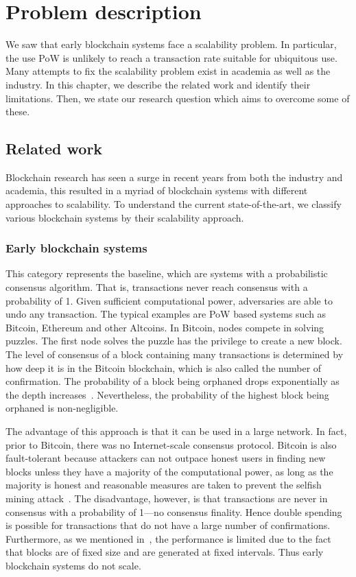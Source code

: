 \chapter{Problem description}
\label{ch:problem}

We saw that early blockchain systems face a scalability problem.
In particular, the use PoW is unlikely to reach a transaction rate suitable for ubiquitous use.
Many attempts to fix the scalability problem exist in academia as well as the industry.
In this chapter, we describe the related work and identify their limitations.
Then, we state our research question which aims to overcome some of these.

\section{Related work}
\label{sec:taxonomy}

Blockchain research has seen a surge in recent years from both the industry and academia,
this resulted in a myriad of blockchain systems with different approaches to scalability.
To understand the current state-of-the-art,
we classify various block\-chain systems by their scalability approach.

\subsection{Early blockchain systems}
This category represents the baseline,
which are systems with a probabilistic consensus algorithm.
That is, transactions never reach consensus with a probability of 1.
Given sufficient computational power, adversaries are able to undo any transaction.
The typical examples are PoW based systems such as Bitcoin, Ethereum and other Altcoins.
In Bitcoin, nodes compete in solving puzzles.
The first node solves the puzzle has the privilege to create a new block.
The level of consensus of a block containing many transactions is determined by how deep it is in the Bitcoin blockchain,
which is also called the number of confirmation.
The probability of a block being orphaned drops exponentially as the depth increases~\cite{bitcoin}.
Nevertheless, the probability of the highest block being orphaned is non-negligible.

The advantage of this approach is that it can be used in a large network.
In fact, prior to Bitcoin, there was no Internet-scale consensus protocol.
Bitcoin is also fault-tolerant because attackers can not outpace honest users in finding new blocks unless they have a majority of the computational power,
as long as the majority is honest and reasonable measures are taken to prevent the selfish mining attack~\cite{eyal2014majority}.
The disadvantage, however, is that transactions are never in consensus with a probability of 1---no consensus finality.
Hence double spending is possible for transactions that do not have a large number of confirmations.
Furthermore, as we mentioned in~,
the performance is limited due to the fact that blocks are of fixed size and are generated at fixed intervals.
Thus early blockchain systems do not scale.


